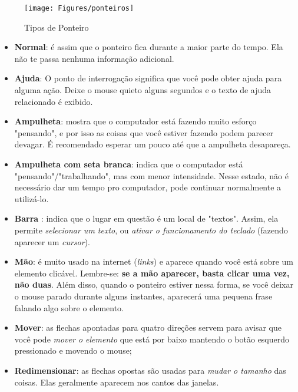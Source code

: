 \documentclass[hidelinks,12pt]{article}
\begin{document}
\begin{figure}[!h]
	\centering
	\texttt{[image: Figures/ponteiros]}
	\caption{Tipos de Ponteiro}
	\label{fig:ponteiros}
\end{figure}


\begin{itemize}
	\item \textbf{Normal}: é assim que o ponteiro fica durante a maior parte do tempo. Ela não te passa nenhuma informação adicional.
	
	\item \textbf{Ajuda}: O ponto de interrogação significa que você pode obter ajuda para alguma ação. Deixe o mouse quieto alguns segundos e o texto de ajuda relacionado é exibido.
	
	\item \textbf{Ampulheta}: mostra que o computador está fazendo muito esforço "pensando", e por isso as coisas que você estiver fazendo podem parecer devagar. É recomendado esperar um pouco até que a ampulheta desapareça.
	
	\item \textbf{Ampulheta com seta branca}: indica que o computador está "pensando"/"trabalhando", mas com menor intensidade. Nesse estado, não é necessário dar um tempo pro computador, pode continuar normalmente a utilizá-lo.
	
	\item \textbf{Barra} : indica que o lugar em questão é um local de "textos". Assim, ela permite \emph{selecionar um texto}, ou \emph{ativar o funcionamento do teclado} (fazendo aparecer um \emph{cursor}).
	
	\item \textbf{Mão}: é muito usado na internet (\emph{links}) e aparece quando você está sobre um elemento clicável. Lembre-se: \textbf{se a mão aparecer, basta clicar uma vez, não duas}. Além disso, quando o ponteiro estiver nessa forma, se você deixar o mouse parado durante alguns instantes, aparecerá uma pequena frase falando algo sobre o elemento.
	
	\item \textbf{Mover}: as flechas apontadas para quatro direções servem para avisar que você pode \emph{mover o elemento} que está por baixo mantendo o botão esquerdo pressionado e movendo o mouse;
	
	\item \textbf{Redimensionar}: as flechas opostas são usadas para \emph{mudar o tamanho} das coisas. Elas geralmente aparecem nos cantos das janelas.

\end{itemize}
\end{document}
